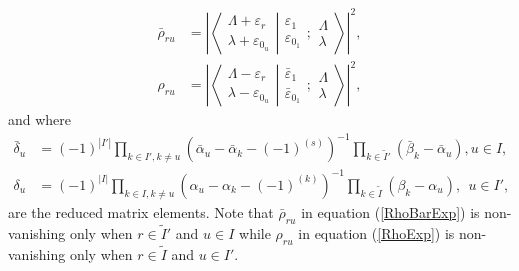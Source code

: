 \documentclass[12pt]{article}
\def\nn{\nonumber}
\begin{document}
\begin{align}
\bar{\rho}_{ru}  &= \left| \left\langle\left. 
\begin{array}{c} \Lambda+\varepsilon_r\\ \lambda+\varepsilon_{0_u} \end{array}
\right|\right.
\left.
\begin{array}{c} \varepsilon_1 \\
\varepsilon_{0_1} \end{array} 
;
 \begin{array}{c} \Lambda \\
\lambda \end{array}
\right\rangle \right|^2, \\
\rho_{ru} &= \left| \left\langle\left. 
\begin{array}{c} \Lambda-\varepsilon_r\\ \lambda-\varepsilon_{0_u} \end{array}
\right|\right.
\left.
\begin{array}{c} \bar{\varepsilon}_1 \\
\bar{\varepsilon}_{0_1}  \end{array}  ; \begin{array}{c} \Lambda \\
\lambda \end{array}
\right\rangle \nn \right|^2,
\end{align}
and where
\begin{align}
\bar{\delta}_u &= (-1)^{|I'|} \prod_{k\in I',k\neq u}\left(\bar{\alpha}_u - \bar{\alpha}_k -
(-1)^{(s)}\right)^{-1} \prod_{k\in \tilde{I}'}\left(\bar{\beta}_k - \bar{\alpha}_u \right), u\in I, \\
\delta_u &= (-1)^{|I|} \prod_{k\in I,k\neq u} \left(\alpha_u - \alpha_k -
(-1)^{(k)}\right)^{-1}\prod_{k\in\tilde{I}} \left(\beta_k - \alpha_u \right),\ \ u\in I',
\end{align}
are the reduced matrix elements.
Note that $\bar{\rho}_{ru}$ in equation (\ref{RhoBarExp}) is non-vanishing only when $r\in \tilde{I}'$ and $u\in I$ while ${\rho}_{ru}$ in equation (\ref{RhoExp}) is non-vanishing only when $r\in \tilde{I}$ and $u\in I'$.
\end{document}
